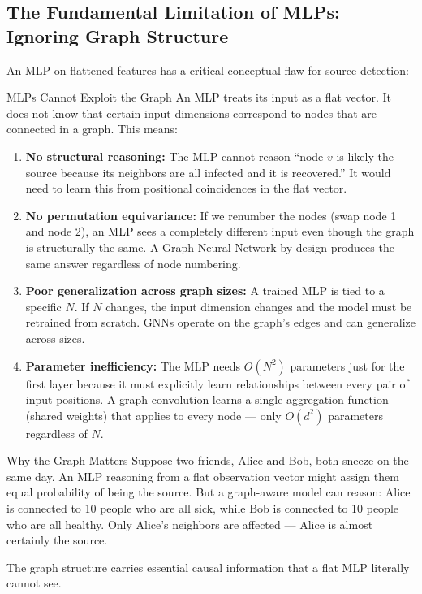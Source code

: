 \subsection{The Fundamental Limitation of MLPs: Ignoring Graph Structure}

An MLP on flattened features has a critical conceptual flaw for source detection:

\begin{keyinsight}{MLPs Cannot Exploit the Graph}
An MLP treats its input as a flat vector. It does not know that certain input dimensions correspond to nodes that are connected in a graph. This means:

\begin{enumerate}
    \item \textbf{No structural reasoning:} The MLP cannot reason ``node $v$ is likely the source because its neighbors are all infected and it is recovered.'' It would need to learn this from positional coincidences in the flat vector.

    \item \textbf{No permutation equivariance:} If we renumber the nodes (swap node 1 and node 2), an MLP sees a completely different input even though the graph is structurally the same. A Graph Neural Network by design produces the same answer regardless of node numbering.

    \item \textbf{Poor generalization across graph sizes:} A trained MLP is tied to a specific $N$. If $N$ changes, the input dimension changes and the model must be retrained from scratch. GNNs operate on the graph's edges and can generalize across sizes.

    \item \textbf{Parameter inefficiency:} The MLP needs $O(N^2)$ parameters just for the first layer because it must explicitly learn relationships between every pair of input positions. A graph convolution learns a single aggregation function (shared weights) that applies to every node --- only $O(d^2)$ parameters regardless of $N$.
\end{enumerate}
\end{keyinsight}

\begin{analogybox}{Why the Graph Matters}
Suppose two friends, Alice and Bob, both sneeze on the same day. An MLP reasoning from a flat observation vector might assign them equal probability of being the source. But a graph-aware model can reason: Alice is connected to 10 people who are all sick, while Bob is connected to 10 people who are all healthy. Only Alice's neighbors are affected --- Alice is almost certainly the source.

The graph structure carries essential causal information that a flat MLP literally cannot see.
\end{analogybox}

